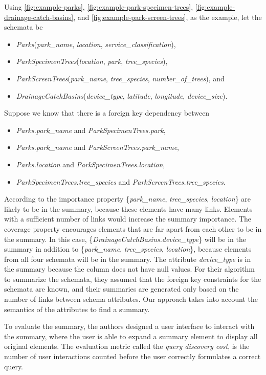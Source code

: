 Using \autoref{fig:example-parks}, \autoref{fig:example-park-specimen-trees}, \autoref{fig:example-drainage-catch-basins}, and \autoref{fig:example-park-screen-trees}, as the example, let the schemata be
\begin{itemize}
	\item[] \textit{Parks}(\textit{park\_name}, \textit{location}, \textit{service\_classification}),
	\item[] \textit{ParkSpecimenTrees}(\textit{location}, \textit{park}, \textit{tree\_species}),
	\item[] \textit{ParkScreenTrees}(\textit{park\_name}, \textit{tree\_species}, \textit{number\_of\_trees}), and 
	\item[] \textit{DrainageCatchBasins}(\textit{device\_type}, \textit{latitude}, \textit{longitude}, \textit{device\_size}).
\end{itemize}
Suppose we know that there is a foreign key dependency between
\begin{itemize}
	\item[] \textit{Parks.park\_name} and \textit{ParkSpecimenTrees.park},
	\item[] \textit{Parks.park\_name} and \textit{ParkScreenTrees.park\_name},
	\item[] \textit{Parks.location} and \textit{ParkSpecimenTrees.location},
	\item[] \textit{ParkSpecimenTrees.tree\_species} and \textit{ParkScreenTrees.tree\_species}.
\end{itemize}
According to the importance property \{\textit{park\_name}, \textit{tree\_species}, \textit{location}\} are likely to be in the summary, because these elements have many links. Elements with a sufficient number of links would increase the summary importance. The coverage property encourages elements that are far apart from each other to be in the summary. In this case, \{\textit{DrainageCatchBasins.device\_type}\} will be in the summary in addition to \{\textit{park\_name}, \textit{tree\_species}, \textit{location}\}, because elements from all four schemata will be in the summary. The attribute \textit{device\_type} is in the summary because the column does not have null values. For their algorithm to summarize the schemata, they assumed that the foreign key constraints for the schemata are known, and their summaries are generated only based on the number of links between schema attributes. Our approach takes into account the semantics of the attributes to find a summary.

To evaluate the summary, the authors designed a user interface to interact with the summary, where the user is able to expand a summary element to display all original elements. The evaluation metric called the \textit{query discovery cost}, is the number of user interactions counted before the user correctly formulates a correct query.

